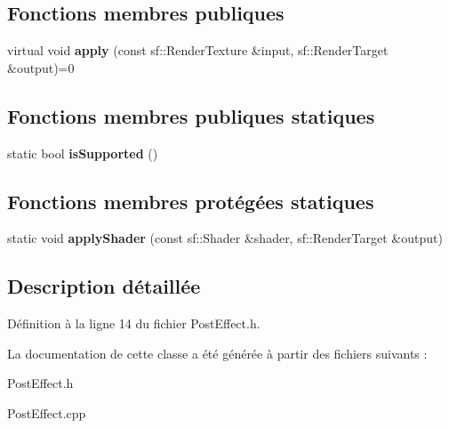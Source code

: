 \subsection*{Fonctions membres publiques}
\begin{DoxyCompactItemize}
\item 
\hypertarget{class_post_effect_a1985593ce1a74dbf8380d5d8c9e89d06}{}\label{class_post_effect_a1985593ce1a74dbf8380d5d8c9e89d06} 
virtual void {\bfseries apply} (const sf\+::\+Render\+Texture \&input, sf\+::\+Render\+Target \&output)=0
\end{DoxyCompactItemize}
\subsection*{Fonctions membres publiques statiques}
\begin{DoxyCompactItemize}
\item 
\hypertarget{class_post_effect_a2fd17f2ecf85d27716dd056cd543ed32}{}\label{class_post_effect_a2fd17f2ecf85d27716dd056cd543ed32} 
static bool {\bfseries is\+Supported} ()
\end{DoxyCompactItemize}
\subsection*{Fonctions membres protégées statiques}
\begin{DoxyCompactItemize}
\item 
\hypertarget{class_post_effect_a919143d710145618fdebf3f1337e17ef}{}\label{class_post_effect_a919143d710145618fdebf3f1337e17ef} 
static void {\bfseries apply\+Shader} (const sf\+::\+Shader \&shader, sf\+::\+Render\+Target \&output)
\end{DoxyCompactItemize}


\subsection{Description détaillée}


Définition à la ligne 14 du fichier Post\+Effect.\+h.



La documentation de cette classe a été générée à partir des fichiers suivants \+:\begin{DoxyCompactItemize}
\item 
Post\+Effect.\+h\item 
Post\+Effect.\+cpp\end{DoxyCompactItemize}
